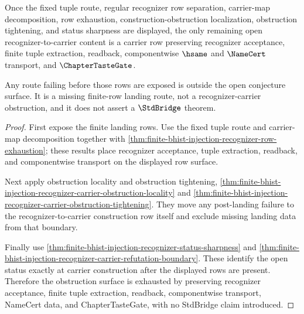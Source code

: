 \begin{theorem}
\label{thm:finite-bhist-injection-recognizer-carrier-obstruction-exhaustion}
Once the fixed tuple route, regular recognizer row separation, carrier-map decomposition, row exhaustion, construction-obstruction localization, obstruction tightening, and status sharpness are displayed, the only remaining open recognizer-to-carrier content is a carrier row preserving recognizer acceptance, finite tuple extraction, readback, componentwise $\hsame$ and $\NameCert$ transport, and $\ChapterTasteGate$.

Any route failing before those rows are exposed is outside the open conjecture surface. It is a missing finite-row landing route, not a recognizer-carrier obstruction, and it does not assert a $\StdBridge$ theorem.
\end{theorem}
\begin{proof}
First expose the finite landing rows. Use the fixed tuple route and carrier-map decomposition together with \autoref{thm:finite-bhist-injection-recognizer-row-exhaustion}; these results place recognizer acceptance, tuple extraction, readback, and componentwise transport on the displayed row surface.

Next apply obstruction locality and obstruction tightening, \autoref{thm:finite-bhist-injection-recognizer-carrier-obstruction-locality} and \autoref{thm:finite-bhist-injection-recognizer-carrier-obstruction-tightening}. They move any post-landing failure to the recognizer-to-carrier construction row itself and exclude missing landing data from that boundary.

Finally use \autoref{thm:finite-bhist-injection-recognizer-status-sharpness} and \autoref{thm:finite-bhist-injection-recognizer-carrier-refutation-boundary}. These identify the open status exactly at carrier construction after the displayed rows are present. Therefore the obstruction surface is exhausted by preserving recognizer acceptance, finite tuple extraction, readback, componentwise transport, NameCert data, and ChapterTasteGate, with no StdBridge claim introduced.
\end{proof}

